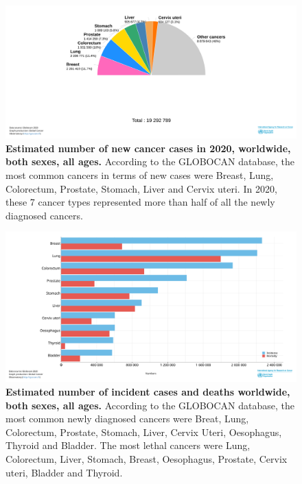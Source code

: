 \begin{figure}[h]
    \includegraphics[width=1\textwidth]{images/intro/cancer-proportion.png}
    \centering
    \caption{ \textbf{Estimated number of new cancer cases in 2020, worldwide,
            both sexes, all ages.} According to the GLOBOCAN database,
        the most common cancers in terms of new cases were
        Breast, Lung, Colorectum, Prostate, Stomach, Liver and Cervix uteri.
        In 2020, these 7 cancer types represented more than half of all the
        newly diagnosed cancers.}
    \label{fig:cancer-proportion}
\end{figure}

\begin{figure}[h]
    \includegraphics[width=1\textwidth]{images/intro/cancer-incidence-mortality.png}
    \centering
    \caption{ \textbf{Estimated number of incident cases and deaths worldwide,
            both sexes, all ages.} According to the GLOBOCAN database, the most common
        newly diagnosed cancers were Breat, Lung, Colorectum, Prostate, Stomach,
        Liver, Cervix Uteri, Oesophagus, Thyroid and Bladder. The most lethal
        cancers were Lung, Colorectum, Liver, Stomach, Breast, Oesophagus,
        Prostate, Cervix uteri, Bladder and Thyroid. }
    \label{fig:cancer-epidemio}
\end{figure}


